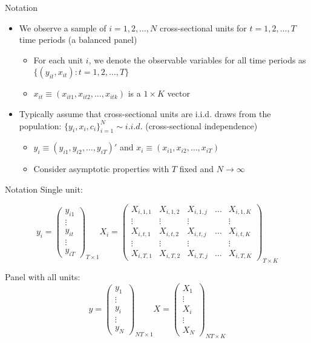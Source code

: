 \documentclass{beamer}
\begin{document}
\begin{frame}{Notation}

\begin{itemize}
	\item We observe a sample of $i=1,2,\dots,N$ cross-sectional units for $t=1,2,\dots,T$ time periods (a balanced panel)
		\begin{itemize}
		\item For each unit $i$, we denote the observable variables for all time periods as $\{(y_{it},x_{it}):t=1,2,\dots,T\}$
		\item $x_{it}\equiv(x_{it1},x_{it2}, \dots, x_{itk})$ is a $1\times K$ vector
		\end{itemize}
	\item Typically assume that cross-sectional units are i.i.d. draws from the population: $\{y_i, x_i, c_i\}^N_{i=1}\sim i.i.d.$ (cross-sectional independence)
		\begin{itemize}
		\item $y_i \equiv (y_{i1}, y_{i2}, \dots, y_{iT})'$ and $x_i \equiv (x_{i1},x_{i2}, \dots, x_{iT})$
		\item Consider asymptotic properties with $T$ fixed and $N\rightarrow \infty$
		\end{itemize}
\end{itemize}

\end{frame}

\begin{frame}{Notation}
Single unit:

\[ y_i = \left( \begin{array}{c}
y_{i1} \\
\vdots \\
y_{it} \\
\vdots \\
y_{iT}
\end{array} \right)_{T\times 1}
%
X_i = \left( \begin{array}{ccccc}
X_{i,1,1} & X_{i,1,2} & X_{i,1,j} & \dots & X_{i,1,K} \\
\vdots & \vdots & \vdots & & \vdots \\
X_{i,t,1} & X_{i,t,2} & X_{i,t,j} & \dots & X_{i,t,K} \\
\vdots & \vdots & \vdots & & \vdots \\
X_{i,T,1} & X_{i,T,2} & X_{i,T,j} & \dots & X_{i,T,K} 
\end{array} \right)_{T\times K}
\]

Panel with all units:
\[ y = \left( \begin{array}{c}
y_{1} \\
\vdots \\
y_{i} \\
\vdots \\
y_{N}
\end{array} \right)_{NT\times 1}
%
X = \left( \begin{array}{c}
X_1  \\
\vdots \\
X_i \\
\vdots \\
X_N
\end{array} \right)_{NT \times K}
\]


\end{frame}
\end{document}
